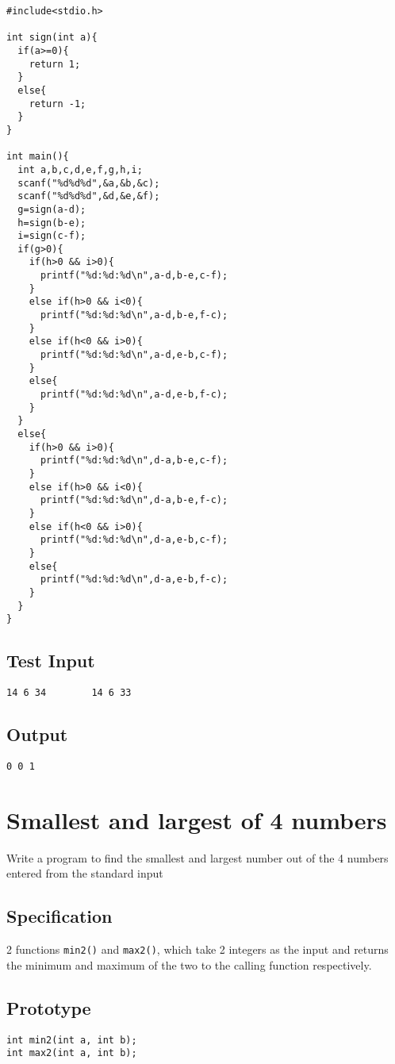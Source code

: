 \documentclass[11pt]{article}
\begin{document}
\begin{verbatim}
#include<stdio.h>

int sign(int a){
  if(a>=0){
    return 1;
  }
  else{
    return -1;
  }
}

int main(){
  int a,b,c,d,e,f,g,h,i;
  scanf("%d%d%d",&a,&b,&c);
  scanf("%d%d%d",&d,&e,&f);
  g=sign(a-d);
  h=sign(b-e);
  i=sign(c-f);
  if(g>0){
    if(h>0 && i>0){
      printf("%d:%d:%d\n",a-d,b-e,c-f);
    }
    else if(h>0 && i<0){
      printf("%d:%d:%d\n",a-d,b-e,f-c);
    }
    else if(h<0 && i>0){
      printf("%d:%d:%d\n",a-d,e-b,c-f);
    }
    else{
      printf("%d:%d:%d\n",a-d,e-b,f-c);
    }  
  }
  else{
    if(h>0 && i>0){
      printf("%d:%d:%d\n",d-a,b-e,c-f);
    }
    else if(h>0 && i<0){
      printf("%d:%d:%d\n",d-a,b-e,f-c);
    }
    else if(h<0 && i>0){
      printf("%d:%d:%d\n",d-a,e-b,c-f);
    }
    else{
      printf("%d:%d:%d\n",d-a,e-b,f-c);
    }  
  }
}
\end{verbatim}

\subsection*{Test Input}
\label{sec-3-6}
\begin{verbatim}
14 6 34        14 6 33
\end{verbatim}
\subsection*{Output}
\label{sec-3-7}
\begin{verbatim}
0 0 1                 
\end{verbatim}

\section{Smallest and largest of 4 numbers}
\label{sec-4}
Write a program to find the smallest and largest number out of the 4 numbers entered 
from the standard input
\subsection*{Specification}
\label{sec-4-1}
2 functions \texttt{min2()} and \texttt{max2()}, which take 2 integers as the input and returns
the minimum and maximum of the two to the calling function respectively.
\subsection*{Prototype}
\label{sec-4-2}
\begin{verbatim}
int min2(int a, int b);
int max2(int a, int b);
\end{verbatim}
\end{document}
